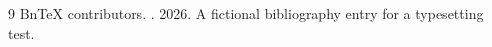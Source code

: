 \renewcommand{\refname}{\BnTeXNativeRegularText{references}}
\begin{thebibliography}{9}
 BnTeX contributors.
. 2026.
A fictional bibliography entry for a typesetting test.
\end{thebibliography}

